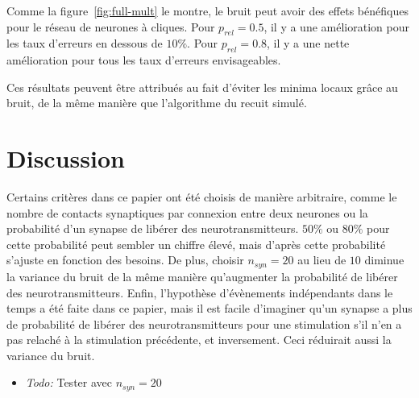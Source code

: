 \documentclass{gretsi}
\begin{document}
Comme la figure~\ref{fig:full-mult} le montre, le bruit peut avoir des effets bénéfiques pour le réseau de neurones à cliques. Pour $p_{rel} = 0.5$, il y a une amélioration pour les taux d'erreurs en dessous de $10\%$. Pour $p_{rel} = 0.8$, il y a une nette amélioration pour tous les taux d'erreurs envisageables.

Ces résultats peuvent être attribués au fait d'éviter les minima locaux gr\^ace au bruit, de la même manière que l'algorithme du recuit simulé.



\section{Discussion}

Certains critères dans ce papier ont été choisis de manière arbitraire, comme le nombre de contacts synaptiques par connexion entre deux neurones ou la probabilité d'un synapse de libérer des neurotransmitteurs. $50\%$ ou $80\%$ pour cette probabilité peut sembler un chiffre élevé, mais d'après \citep{branco2009probability} cette probabilité s'ajuste en fonction des besoins. De plus, choisir $n_{syn}=20$ au lieu de $10$ diminue la variance du bruit de la même manière qu'augmenter la probabilité de libérer des neurotransmitteurs. Enfin, l'hypothèse d'évènements indépendants dans le temps a été faite dans ce papier, mais il est facile d'imaginer qu'un synapse a plus de probabilité de libérer des neurotransmitteurs pour une stimulation s'il n'en a pas relaché à la stimulation précédente, et inversement. Ceci réduirait aussi la variance du bruit.


\begin{itemize}
\item \emph{Todo: } Tester avec $n_{syn}=20$
\end{itemize}





\end{document}
